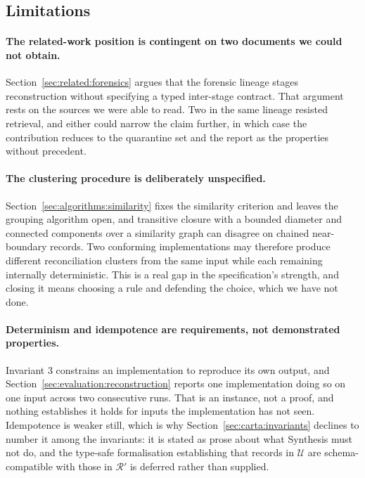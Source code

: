 \subsection{Limitations}
\label{sec:discussion:limitations}

\paragraph{The related-work position is contingent on two documents we could not
obtain.}
Section~\ref{sec:related:forensics} argues that the forensic lineage stages
reconstruction without specifying a typed inter-stage contract. That argument
rests on the sources we were able to read. Two in the same lineage resisted
retrieval, and either could narrow the claim further, in which case the
contribution reduces to the quarantine set and the report as the properties
without precedent.

\paragraph{The clustering procedure is deliberately unspecified.}
Section~\ref{sec:algorithms:similarity} fixes the similarity criterion and leaves
the grouping algorithm open, and transitive closure with a bounded diameter and
connected components over a similarity graph can disagree on chained
near-boundary records. Two conforming implementations may therefore produce
different reconciliation clusters from the same input while each remaining
internally deterministic. This is a real gap in the specification's strength, and
closing it means choosing a rule and defending the choice, which we have not done.

\paragraph{Determinism and idempotence are requirements, not demonstrated
properties.}
Invariant 3 constrains an implementation to reproduce its own output, and
Section~\ref{sec:evaluation:reconstruction} reports one implementation doing so
on one input across two consecutive runs. That is an instance, not a proof, and
nothing establishes it holds for inputs the implementation has not seen.
Idempotence is weaker
still, which is why Section~\ref{sec:carta:invariants} declines to number it among
the invariants: it is stated as prose about what Synthesis must not do, and the
type-safe formalisation establishing that records in $\mathcal{U}$ are
schema-compatible with those in $\mathcal{R}'$ is deferred rather than supplied.

